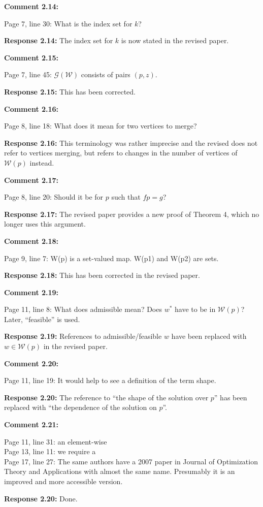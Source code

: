 \documentclass[11pt, a4paper]{article}
\newcommand{\comment}[1]{{%
\begin{sffamily}\leavevmode\color{black}#1
\end{sffamily}}}%
\def\v{\vspace{2mm}}
\begin{document}
\v
\textbf{Comment 2.14:}
\comment{
Page 7, line 30: What is the index set for $k$?
}

\v
\textbf{Response 2.14:}
The index set for $k$ is now stated in the revised paper.

\v
\textbf{Comment 2.15:}
\comment{
Page 7, line 45: $\mathscr G(\mathcal W)$ consists of pairs $(p,z)$.}


\v
\textbf{Response 2.15:}
This has been corrected.

\v
\textbf{Comment 2.16:}
\comment{Page 8, line 18: What does it mean for two vertices to merge?}

\v
\textbf{Response 2.16:}
This terminology was rather imprecise and the revised does not refer to vertices merging, but refers to changes in the number of vertices of $\mathcal W(p)$ instead.

\v
\textbf{Comment 2.17:}
\comment{Page 8, line 20: Should it be for $p$ such that $fp = g$?}

\v
\textbf{Response 2.17:}
The revised paper provides a new proof of Theorem 4, which no longer uses this argument.


\v
\textbf{Comment 2.18:}
\comment{Page 9, line 7: W(p) is a set-valued map. W(p1) and W(p2) are sets.}

\v
\textbf{Response 2.18:}
This has been corrected in the revised paper.

\v
\textbf{Comment 2.19:}
\comment{Page 11, line 8: What does admissible mean? Does $w^\ast$ have to be in $\mathcal W(p)$? Later, “feasible” is used.}

\v
\textbf{Response 2.19:}
References to admissible/feasible $w$ have been replaced with $w\in\mathcal W(p)$ in the revised paper.

\v
\textbf{Comment 2.20:}
\comment{Page 11, line 19: It would help to see a definition of the term shape.}

\v
\textbf{Response 2.20:}
The reference to ``the shape of the solution over $p$'' has been replaced with ``the dependence of the solution on $p$''.

\v
\textbf{Comment 2.21:}
\comment{Page 11, line 31: an element-wise\\
Page 13, line 11: we require a\\
Page 17, line 27: The same authors have a 2007 paper in Journal of Optimization Theory and Applications with almost the same name. Presumably it is an improved and more accessible version.}

\v
\textbf{Response 2.20:}
Done.
\end{document}
